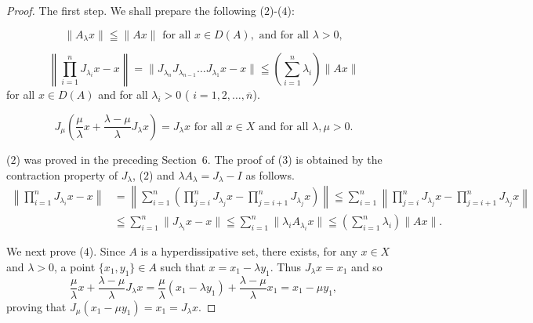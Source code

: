 \begin{proof}
 The first step. We shall prepare the following ($2$)-($4$): 

\begin{equation}\label{eq:XIV.7.2}
\|A_{\lambda}x\| \leqq \|Ax\| \text{ for all } x \in D(A), \text{ and for all } \lambda > 0,
\end{equation}

\begin{equation}\label{eq:XIV.7.3}
\left\| \prod\limits_{i=1} ^{n} J _ {\lambda_{i}} x - x \right\| = \| J _ {\lambda_{n}} J _ {\lambda_{n-1}} \dots J _ {\lambda_{1}} x - x \| \leqq \left(\sum\limits_{i=1} ^{n} \lambda_{i}\right) \| A x \|
\end{equation}
for all $x \in D(A)$ and for all $\lambda_i > 0$ ( $i = 1, 2, \ldots, \overline{n}$). 

\begin{equation}\label{eq:XIV.7.4}
J_{\mu}\left(\frac{\mu}{\lambda} x + \frac{\lambda - \mu}{\lambda} J_{\lambda}x\right) = J_{\lambda}x \text{ for all } x \in X \text{ and for all } \lambda, \mu > 0.
\end{equation}


($2$) was proved in the preceding Section~\hyperref[sec:XIV.6]{$6$}. The proof of ($3$) is obtained by the contraction property of $J_{\lambda}$, ($2$) and $\lambda A_{\lambda} = J_{\lambda} - I$ as follows. 
\[
\begin{aligned}
\left\| \prod\limits_{i=1} ^{n} J _ {\lambda_{i}} x - x \right\|& = \left\| \sum\limits_{i=1} ^{n} \left(\prod\limits_{j=i} ^{n} J _ {\lambda_{j}} x - \prod\limits_{j=i+1} ^{n} J _ {\lambda_{j}} x\right) \right\| \leqq \sum\limits_{i=1} ^{n} \left\| \prod\limits_{j=i} ^{n} J _ {\lambda_{j}} x - \prod\limits_{j=i+1} ^{n} J _ {\lambda_{j}} x \right\|
\\
&\leqq \sum\limits_{i=1} ^{n} \| J _ {\lambda_{i}} x - x \| \leqq \sum\limits_{i=1} ^{n} \| \lambda_{i} A _ {\lambda_{i}} x \| \leqq \left(\sum\limits_{i=1} ^{n} \lambda_{i}\right) \| A x \|.
\end{aligned}
\]

We next prove ($4$). Since $A$ is a hyperdissipative set, there exists, for any $x \in X$ and $\lambda > 0$, a point $\{x_1, y_1\} \in A$ such that $x = x_1 - \lambda y_1$. Thus $J_\lambda x = x_1$ and so 
\[
\frac {\mu}{\lambda} x + \frac {\lambda - \mu}{\lambda} J _{\lambda} x = \frac {\mu}{\lambda} (x _{1} - \lambda y _{1}) + \frac {\lambda - \mu}{\lambda} x _{1} = x _{1} - \mu y _{1},
\]
proving that $J_{\mu}(x_1 - \mu y_1) = x_1 = J_{\lambda}x$. 


\end{proof}
